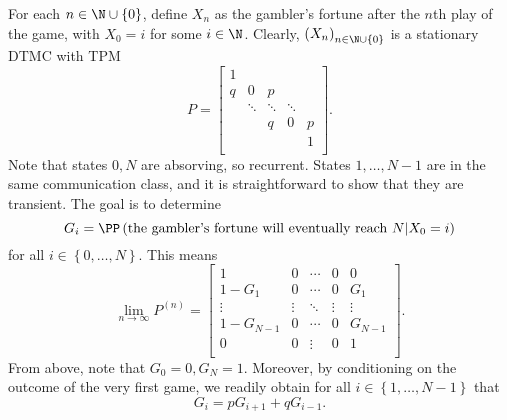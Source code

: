 \documentclass[stat333]{subfiles}
\begin{document}
    \begin{subproof}[Answer]
        For each $n\in\N\cup\left\lbrace 0 \right\rbrace$, define $X_n$ as the gambler's fortune after the $n$th play of the game, with $X_0=i$ for some $i\in\N$. Clearly, $\left( X_{n} \right)^{}_{n\in\N\cup\left\lbrace 0 \right\rbrace}$ is a stationary DTMC with TPM
        \begin{equation*}
            P = 
            \begin{bmatrix}
                1 &  &  &  &  \\
                q & 0 & p &  &  \\
                 & \ddots & \ddots & \ddots &  \\
                 &  & q & 0 & p \\
                 &  &  &  & 1 \\
            \end{bmatrix}.
        \end{equation*}
        Note that states $0,N$ are absorving, so recurrent. States $1,\ldots,N-1$ are in the same communication class, and it is straightforward to show that they are transient. The goal is to determine
        \begin{equation*}
            G_i = \PP\left( \text{the gambler's fortune will eventually reach $N$}|X_0=i \right)
        \end{equation*}
        for all $i\in\left\lbrace 0,\ldots,N \right\rbrace$. This means
        \begin{equation*}
            \lim_{n\to\infty} P^{\left( n \right)} = 
            \begin{bmatrix}
                1 & 0 & \cdots & 0 & 0 \\
                1-G_1 & 0 & \cdots & 0 & G_1 \\
                \vdots & \vdots & \ddots & \vdots & \vdots \\
                1-G_{N-1} & 0 & \cdots & 0 & G_{N-1} \\
                0 & 0 & \vdots & 0 & 1 \\
            \end{bmatrix}.
        \end{equation*}
        From above, note that $G_0=0, G_N=1$. Moreover, by conditioning on the outcome of the very first game, we readily obtain for all $i\in\left\lbrace 1,\ldots,N-1 \right\rbrace$ that
        \begin{equation*}
            G_i = pG_{i+1}+qG_{i-1}.
        \end{equation*}

\end{subproof}
\end{document}
